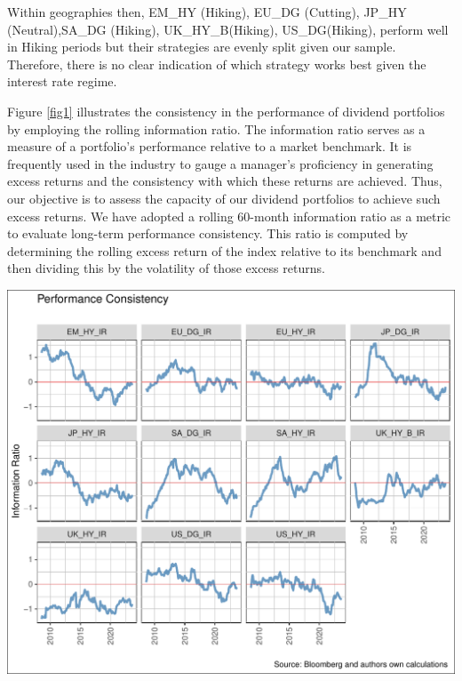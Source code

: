 \documentclass[12pt,preprint, authoryear]{elsarticle}
\let\origfigure\figure
\let\endorigfigure\endfigure
\renewenvironment{figure}[1][2] {
    \expandafter\origfigure\expandafter[H]
} {
    \endorigfigure
}
\numberwithin{equation}{section}
\numberwithin{figure}{section}
\numberwithin{table}{section}
\begin{document}
Within geographies then, EM\_HY (Hiking), EU\_DG (Cutting), JP\_HY
(Neutral),SA\_DG (Hiking), UK\_HY\_B(Hiking), US\_DG(Hiking), perform
well in Hiking periods but their strategies are evenly split given our
sample. Therefore, there is no clear indication of which strategy works
best given the interest rate regime.

Figure \ref{fig1} illustrates the consistency in the performance of
dividend portfolios by employing the rolling information ratio. The
information ratio serves as a measure of a portfolio's performance
relative to a market benchmark. It is frequently used in the industry to
gauge a manager's proficiency in generating excess returns and the
consistency with which these returns are achieved. Thus, our objective
is to assess the capacity of our dividend portfolios to achieve such
excess returns. We have adopted a rolling 60-month information ratio as
a metric to evaluate long-term performance consistency. This ratio is
computed by determining the rolling excess return of the index relative
to its benchmark and then dividing this by the volatility of those
excess returns.

\begin{figure}[H]

\includegraphics{Much_Ado_About_Dividends_files/figure-latex/unnamed-chunk-1-1} \hfill{}

\caption{Rolling 3 Year Returns \label{fig1}}\label{fig:unnamed-chunk-1}
\end{figure}
\end{document}
